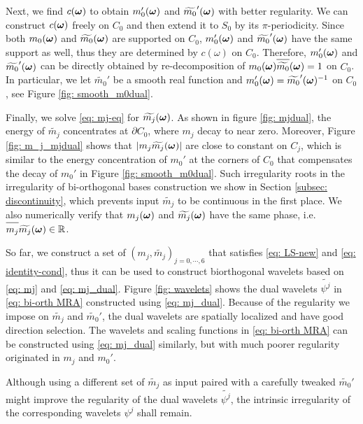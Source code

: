 Next, we find $c(\boldsymbol{\omega})$ to obtain $m_0'(\boldsymbol{\omega})$ and $\widetilde{m_0}'(\boldsymbol{\omega})$ with better regularity. We can construct $c(\boldsymbol{\omega})$ freely on $C_0$ and then extend it to $S_0$ by its $\pi$-periodicity. Since both $m_0(\boldsymbol{\omega})$ and $\widetilde{m_{0}}(\boldsymbol{\omega})$ are supported on $C_0$, $m_0'(\boldsymbol{\omega})$ and $\widetilde{m_0}'(\boldsymbol{\omega})$ have the same support as well, thus they are determined by $c(\omega)$ on $C_0$. Therefore, $m_0'(\boldsymbol{\omega})$ and $\widetilde{m_0}'(\boldsymbol{\omega})$ can be directly obtained by re-decomposition of $m_0(\V{\omega})\sbarm{0}=1$ on $C_0$. In particular, we let $\widetilde{m_0}'$ be a smooth real function and $m_0'(\boldsymbol{\omega}) = \widetilde{m_0}'(\boldsymbol{\omega})^{-1}$ on $C_0$, see Figure \ref{fig: smooth_m0dual}.

Finally, we solve \eqref{eq: mj-eq} for $\widetilde{m_{j}}(\boldsymbol{\omega})$. As shown in figure \ref{fig: mjdual}, the energy of $\widetilde{m_j}$ concentrates at $\partial C_0$, where $m_j$ decay to near zero. Moreover, Figure \ref{fig: m_j_mjdual} shows that $|m_j\widetilde{m_{j}}(\boldsymbol{\omega})|$ are close to constant on $C_j$, which is similar to the energy concentration of $m_0'$ at the corners of $C_0$ that compensates the decay of $m_0'$ in Figure \ref{fig: smooth_m0dual}. Such irregularity roots in the irregularity of bi-orthogonal bases construction we show in Section \ref{subsec: discontinuity}, which prevents input $\widetilde{m_j}$ to be continuous in the first place.
 We also numerically verify that $m_j(\boldsymbol{\omega})$ and $\widetilde{m_{j}}(\boldsymbol{\omega})$ have the same phase, i.e. $\overlinespace{m_j}\m{j}\in \mathbb{R}$.

So far, we construct a set of $(m_j,\widetilde{m_j})_{j = 0,\cdots,6}$ that satisfies \eqref{eq: LS-new} and \eqref{eq: identity-cond}, thus it can be used to construct biorthogonal wavelets based on \eqref{eq: mj} and \eqref{eq: mj_dual}. Figure \ref{fig: wavelets} shows the dual wavelets  $\widetilde{\psi^j}$ in \eqref{eq: bi-orth MRA} constructed using \eqref{eq: mj_dual}. Because of the regularity we impose on $\widetilde{m_j}$ and $\widetilde{m_0}'$, the dual wavelets are spatially localized and have good direction selection. The wavelets and scaling functions in \eqref{eq: bi-orth MRA} can be constructed using \eqref{eq: mj_dual} similarly, but with much poorer regularity originated in $m_j$ and $m_0'$.

Although using a different set of $\widetilde{m_j}$ as input paired with a carefully tweaked $\widetilde{m_0}'$ might improve the regularity of the dual wavelets $\widetilde{\psi^j}$, the intrinsic irregularity of the corresponding wavelets $\psi^j$ shall remain.

